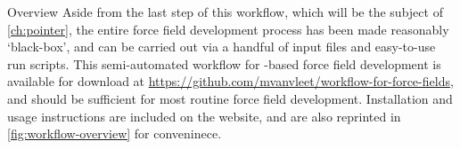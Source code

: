 \begin{section}{Overview}
Aside from the last step of this workflow, which will be the subject of
\cref{ch:pointer}, the entire force field development
process has been made reasonably `black-box', and can be carried out via a
handful of input files and easy-to-use run scripts. This semi-automated workflow
for \sapt-based force field development is available for download 
at
\url{https://github.com/mvanvleet/workflow-for-force-fields}, and should be
sufficient for most routine force field development. Installation and
usage instructions are included on the website, and are also reprinted in
\cref{fig:workflow-overview} for conveninece. 



\end{section}
